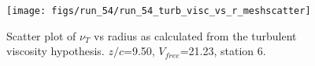 \begin{figure}[H]
\centering
\texttt{[image: figs/run\_54/run\_54\_turb\_visc\_vs\_r\_meshscatter]}
\caption{Scatter plot of $\nu_T$ vs radius as calculated from the turbulent viscosity hypothesis. $z/c$=9.50, $V_{free}$=21.23, station 6.}
\label{fig:run_54_turb_visc_vs_r_meshscatter}
\end{figure}


